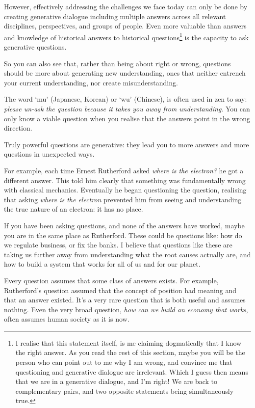However, effectively addressing the challenges we face today can only be done by creating generative dialogue including multiple answers across all relevant disciplines, perspectives, and groups of people. Even more valuable than answers and knowledge of historical answers to historical questions\footnote{I realise that this statement itself, is me claiming dogmatically that I know the right answer. As you read the rest of this section, maybe you will be the person who can point out to me why I am wrong, and convince me that questioning and generative dialogue are irrelevant. Which I guess then means that we are in a generative dialogue, and I'm right! We are back to complementary pairs, and two opposite statements being simultaneously true.} is the capacity to ask generative questions.






So you can also see that, rather than being about right or wrong, questions should be more about generating new understanding, ones that neither entrench your current understanding, nor create misunderstanding.


The word ‘mu’ (Japanese, Korean) or ‘wu’ (Chinese), is often used in zen to say: \emph{please un-ask the question because it takes you away from understanding}. You can only know a viable question when you realise that the answers point in the wrong direction. 


Truly powerful questions are generative: they lead you to more answers and more questions in unexpected ways.


For example, each time Ernest Rutherford asked \emph{where is the electron?} he got a different answer. This told him clearly that something was fundamentally wrong with classical mechanics. Eventually he began questioning the question, realising that asking \emph{where is the electron} prevented him from seeing and understanding the true nature of an electron: it has no place. 


If you have been asking questions, and none of the answers have worked, maybe you are in the same place as Rutherford. These could be questions like: how do we regulate business, or fix the banks. I believe that questions like these are taking us further away from understanding what the root causes actually are, and how to build a system that works for all of us and for our planet.


Every question assumes that some class of answers exists. For example, Rutherford's question assumed that the concept of position had meaning and that an answer existed. It's a very rare question that is both useful and assumes nothing. Even the very broad question, \emph{how can we build an economy that works}, often assumes human society as it is now.


